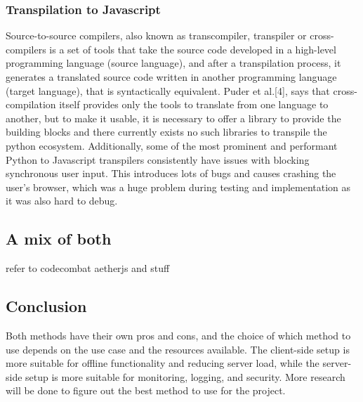 

% 


\subsubsection{Transpilation to Javascript}
Source-to-source compilers, also known as transcompiler, transpiler or cross-compilers is a set of tools that take the source code developed in a high-level programming language (source language), and after a transpilation process, it generates a translated source code written in another programming language (target language), that is syntactically equivalent. Puder et al.[4], says that cross-compilation itself provides only the tools to translate from one language to another, but to make it usable, it is necessary to offer a library to provide the building blocks and there currently exists no such libraries to transpile the python ecosystem. Additionally, some of the most prominent and performant Python to Javascript transpilers consistently have issues with blocking synchronous user input. This introduces lots of bugs and causes crashing the user's browser, which was a huge problem during testing and implementation as it was also hard to debug.





\subsection{A mix of both}
refer to codecombat aetherjs and stuff

\subsection{Conclusion}
Both methods have their own pros and cons, and the choice of which method to use depends on the use case and the resources available. The client-side setup is more suitable for offline functionality and reducing server load, while the server-side setup is more suitable for monitoring, logging, and security. More research will be done to figure out the best method to use for the project.
